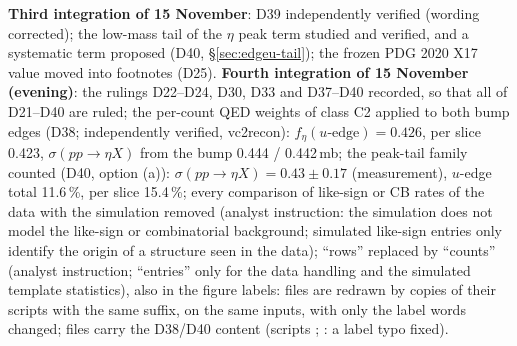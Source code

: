\documentclass[11pt,a4paper]{article}
\newcommand{\code}[1]{\texttt{\detokenize{#1}}}
\newcommand{\sigeta}{\ensuremath{\sigma(pp\to\eta X)}\xspace}
\begin{document}
\textbf{Third integration of 15 November}: D39 independently verified (wording corrected); the low-mass tail of the $\eta$ peak term studied
and verified, and a systematic term proposed (D40, \S\ref{sec:edgeu-tail}); the frozen PDG 2020 X17 value moved into footnotes (D25).
\textbf{Fourth integration of 15 November (evening)}: the rulings D22--D24, D30, D33 and D37--D40 recorded, so that all of D21--D40 are ruled;
the per-count QED weights of class C2 applied to both bump edges (D38; independently verified, vc2recon): $f_\eta(u\text{-edge})=0.426$, per slice
0.423, \sigeta from the bump 0.444 / 0.442\,mb; the peak-tail family counted (D40, option (a)): \sigeta $=0.43\pm0.17$ (measurement), $u$-edge total
11.6\,\%, per slice 15.4\,\%; every comparison of like-sign or CB rates of the data with the simulation removed (analyst instruction: the simulation
does not model the like-sign or combinatorial background; simulated like-sign entries only identify the origin of a structure seen in the data);
``rows'' replaced by ``counts'' (analyst instruction; ``entries'' only for the data handling and the simulated template statistics),
also in the figure labels: files \code{<name>_cnt} are redrawn by copies of their scripts with the same suffix, on the same inputs, with
only the label words changed; files \code{<name>_v3} carry the D38/D40 content (scripts \code{*_v3.py}; \code{_v3b}: a label typo fixed).

\end{document}

